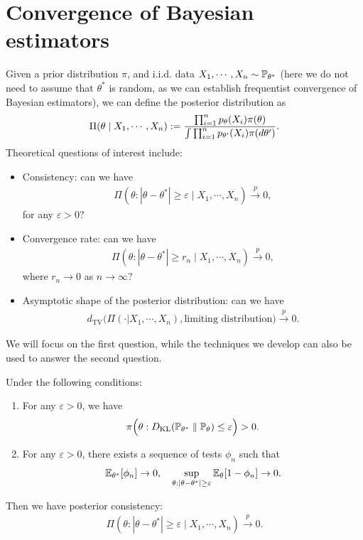 \documentclass[11pt,letterpaper]{article}
\numberwithin{theorem}{lecture}
\numberwithin{proposition}{lecture}
\numberwithin{lemma}{lecture}
\numberwithin{claim}{lecture}
\numberwithin{corollary}{lecture}
\numberwithin{definition}{lecture}
\numberwithin{conjecture}{lecture}
\numberwithin{remark}{lecture}
\numberwithin{example}{lecture}
\numberwithin{equation}{lecture}
\begin{document}
\section{Convergence of Bayesian estimators}
Given a prior distribution $\pi$, and $\mathrm{i.i.d.}$ data $X_1, \cdots, X_n \sim {\mathbb{P}}_{\theta^*}$ (here we do not need to assume that $\theta^*$ is random, as we can establish frequentist convergence of Bayesian estimators), we can define the posterior distribution as
\begin{align*}
  \Pi ( \theta \mid X_1, \cdots, X_n) := \frac{\prod_{i=1}^n p_\theta (X_i) \pi (\theta)}{\int \prod_{i=1}^n p_{\theta'} (X_i) \pi (d\theta')}.
\end{align*}
Theoretical questions of interest include:
\begin{itemize}
\item Consistency: can we have
\begin{align*}
  \Pi ( \theta: |\theta - \theta^*| \geq \varepsilon \mid X_1, \cdots, X_n) \xrightarrow{p} 0,
\end{align*}
for any $\varepsilon > 0$?
\item Convergence rate: can we have
\begin{align*}
  \Pi ( \theta: |\theta - \theta^*| \geq r_n \mid X_1, \cdots, X_n) \xrightarrow{p} 0,
\end{align*}
where $r_n \to 0$ as $n \to \infty$?
\item Asymptotic shape of the posterior distribution: can we have
\begin{align*}
 d_{\mathrm{TV}} \Big( \Pi (\cdot | X_1, \cdots, X_n), \mbox{limiting distribution} \Big) \xrightarrow{p} 0.
\end{align*}
\end{itemize}
We will focus on the first question, while the techniques we develop can also be used to answer the second question.
\begin{theorem}[Schwartz]
  Under the following conditions:
  \begin{enumerate}
    \item For any $\varepsilon > 0$, we have
    \begin{align*}
      \pi \Big( \theta: D_{\text{KL}}({\mathbb{P}}_{\theta^*}\; \| \; {\mathbb{P}}_\theta)\leq \varepsilon \Big) > 0.
    \end{align*}
    \item For any $\varepsilon > 0$, there exists a sequence of tests $\phi_n$ such that
    \begin{align*}
      {\mathbb{E}}_{\theta^*} [\phi_n] \to 0, \quad \sup_{\theta: |\theta - \theta^*| \geq \varepsilon} {\mathbb{E}}_\theta [1 - \phi_n] \to 0.
    \end{align*}
  \end{enumerate}
  Then we have posterior consistency:
  \begin{align*}
    \Pi ( \theta: |\theta - \theta^*| \geq \varepsilon \mid X_1, \cdots, X_n) \xrightarrow{p} 0.
  \end{align*}
\end{theorem}
\end{document}
